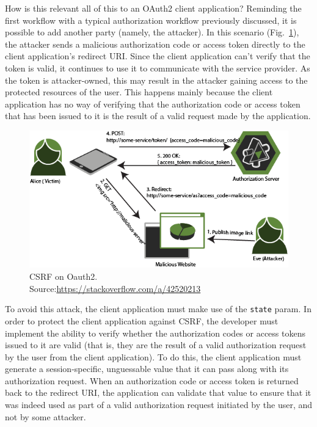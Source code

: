 How is this relevant all of this to an OAuth2 client application? 
Reminding the first workflow with a typical authorization workflow previously discussed, it is possible to add another party (namely, the attacker). In this scenario (Fig.~\ref{fig:csrf}), the attacker sends a malicious authorization code or access token directly to the client application's redirect URI. Since the client application can't verify that the token is valid, it continues to use it to communicate with the service provider. As the token is attacker-owned, this may result in the attacker gaining access to the protected resources of the user.
This happens mainly because the client application has no way of verifying that the authorization code or access token that has been issued to it is the result of a valid request made by the application.

\vspace{1.5cm}

\begin{figure}[ht]
    \centering
    \includegraphics[scale=0.65]{chapters/images/chp4/csrf.png}
    \caption[caption]{CSRF on Oauth2.\\\hspace{\textwidth}Source:\hspace{0.2cm}\url{https://stackoverflow.com/a/42520213}}
    \label{fig:csrf}
\end{figure}

\vspace{1.5cm}

To avoid this attack, the client application must make use of the \texttt{state} param.
In order to protect the client application against CSRF, the developer must implement the ability to verify whether the authorization codes or access tokens issued to it are valid (that is, they are the result of a valid authorization request by the user from the client application). To do this, the client application must generate a session-specific, unguessable value that it can pass along with its authorization request. When an authorization code or access token is returned back to the redirect URI, the application can validate that value to ensure that it was indeed used as part of a valid authorization request initiated by the user, and not by some attacker.

